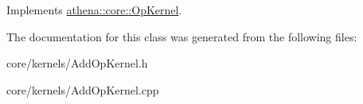 Implements \mbox{\hyperlink{classathena_1_1core_1_1_op_kernel_a926afa57c90b4a999419cbbdc0496c65}{athena\+::core\+::\+Op\+Kernel}}.



The documentation for this class was generated from the following files\+:\begin{DoxyCompactItemize}
\item 
core/kernels/Add\+Op\+Kernel.\+h\item 
core/kernels/Add\+Op\+Kernel.\+cpp\end{DoxyCompactItemize}
